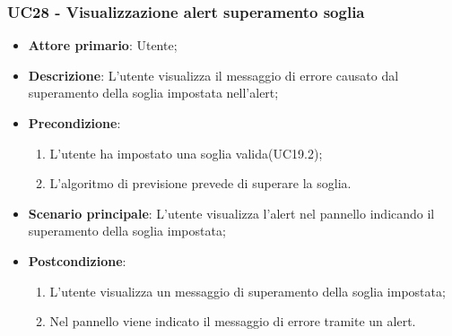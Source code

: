 \subsubsection{UC28 - Visualizzazione alert superamento soglia}
\label{sssec:uc28}
\begin{itemize}
  \item \textbf{Attore primario}: Utente;
  \item \textbf{Descrizione}: L'utente visualizza il messaggio di errore causato dal superamento della soglia impostata nell'alert;
  \item \textbf{Precondizione}:
  \begin{enumerate}
		\item L'utente ha impostato una soglia valida(UC19.2);
		\item L'algoritmo di previsione prevede di superare la soglia.
	\end{enumerate}
  \item \textbf{Scenario principale}:  L'utente visualizza l'alert nel pannello indicando il superamento della soglia impostata;
  \item \textbf{Postcondizione}:
  \begin{enumerate}
		\item L'utente visualizza un messaggio di superamento della soglia impostata;
		\item Nel pannello viene indicato il messaggio di errore tramite un alert.
	\end{enumerate}
\end{itemize}
